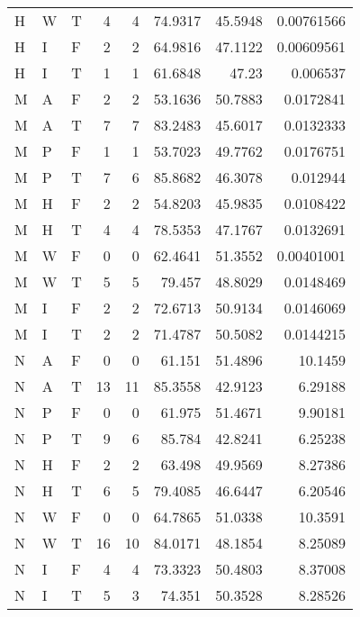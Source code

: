 \begin{table}[!htb]
{\begin{tabular}{lllrrrrr}
            H     & W     & T          & 4    & 4     & 74.9317    & 45.5948  & 0.00761566 \\
            H     & I     & F          & 2    & 2     & 64.9816    & 47.1122  & 0.00609561 \\
            H     & I     & T          & 1    & 1     & 61.6848    & 47.23    & 0.006537   \\
            M     & A     & F          & 2    & 2     & 53.1636    & 50.7883  & 0.0172841  \\
            M     & A     & T          & 7    & 7     & 83.2483    & 45.6017  & 0.0132333  \\
            M     & P     & F          & 1    & 1     & 53.7023    & 49.7762  & 0.0176751  \\
            M     & P     & T          & 7    & 6     & 85.8682    & 46.3078  & 0.012944   \\
            M     & H     & F          & 2    & 2     & 54.8203    & 45.9835  & 0.0108422  \\
            M     & H     & T          & 4    & 4     & 78.5353    & 47.1767  & 0.0132691  \\
            M     & W     & F          & 0    & 0     & 62.4641    & 51.3552  & 0.00401001 \\
            M     & W     & T          & 5    & 5     & 79.457     & 48.8029  & 0.0148469  \\
            M     & I     & F          & 2    & 2     & 72.6713    & 50.9134  & 0.0146069  \\
            M     & I     & T          & 2    & 2     & 71.4787    & 50.5082  & 0.0144215  \\
            N     & A     & F          & 0    & 0     & 61.151     & 51.4896  & 10.1459    \\
            N     & A     & T          & 13   & 11    & 85.3558    & 42.9123  & 6.29188    \\
            N     & P     & F          & 0    & 0     & 61.975     & 51.4671  & 9.90181    \\
            N     & P     & T          & 9    & 6     & 85.784     & 42.8241  & 6.25238    \\
            N     & H     & F          & 2    & 2     & 63.498     & 49.9569  & 8.27386    \\
            N     & H     & T          & 6    & 5     & 79.4085    & 46.6447  & 6.20546    \\
            N     & W     & F          & 0    & 0     & 64.7865    & 51.0338  & 10.3591    \\
            N     & W     & T          & 16   & 10    & 84.0171    & 48.1854  & 8.25089    \\
            N     & I     & F          & 4    & 4     & 73.3323    & 50.4803  & 8.37008    \\
            N     & I     & T          & 5    & 3     & 74.351     & 50.3528  & 8.28526    \\
            \hline
        \end{tabular}
    }{}
\end{table}